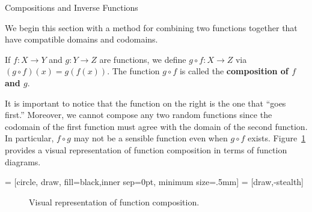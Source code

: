 \begin{section}{Compositions and Inverse Functions}\label{sec:Compositions and Inverse Functions}

We begin this section with a method for combining two functions together that have compatible domains and codomains.

\begin{definition}
If $f:X\to Y$ and $g:Y\to Z$ are functions, we define $g\circ f:X\to Z$ via $\boxed{(g\circ f)(x)=g(f(x))}$. The function $g\circ f$ is called the \textbf{composition of $f$ and $g$}.
\end{definition}

It is important to notice that the function on the right is the one that ``goes first.''  Moreover, we cannot compose any two random functions since the codomain of the first function must agree with the domain of the second function.  In particular, $f\circ g$ may not be a sensible function even when $g\circ f$ exists. Figure~\ref{fig:function composition} provides a visual representation of function composition in terms of function diagrams.

 = [circle, draw, fill=black,inner sep=0pt, minimum size=.5mm]
 = [draw,-stealth]

\begin{figure}[h!]
\begin{center}
\caption{Visual representation of function composition.}\label{fig:function composition}
\end{center}
\end{figure}


\end{section}
